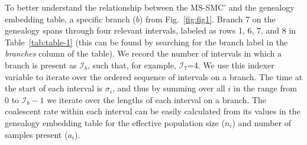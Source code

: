 \documentclass[11pt]{article}
\begin{document}
To better understand the relationship between the MS-SMC' and the genealogy
embedding table, a specific branch ($b$) from Fig.~\ref{fig:fig1}. 
Branch 7 on the genealogy spans through four relevant intervals, 
labeled as rows 1, 6, 7, and 8 in Table~\ref{tab:table-1} 
(this can be found by searching for the branch label in the \emph{branches} 
column of the table). We record the number 
of intervals in which a branch is present as $\mathcal{I}_b$, such that,
for example, $\mathcal{I}_7$=4. We use this indexer variable to iterate
over the ordered sequence of intervals on a branch. 
The time at the start of each interval is $\sigma_i$, and thus by summing 
over all $i$ in the range from 0 to $\mathcal{I}_b - 1$ we iterate
over the lengths of each interval on a branch. 
The coalescent rate within each interval can be easily calculated from its
values in the genealogy embedding table for the
effective population size ($n_i$) and number of samples present ($a_i$).





\end{document}
